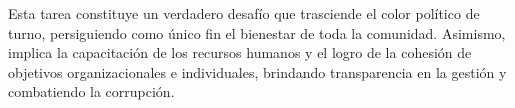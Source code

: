 \documentclass[
  a4paper,
]{article}
\begin{document}
Esta tarea constituye un verdadero desafío que trasciende el color
político de turno, persiguiendo como único fin el bienestar de toda la
comunidad. Asimismo, implica la capacitación de los recursos humanos y
el logro de la cohesión de objetivos organizacionales e individuales,
brindando transparencia en la gestión y combatiendo la corrupción.


\printbibliography
\end{document}
